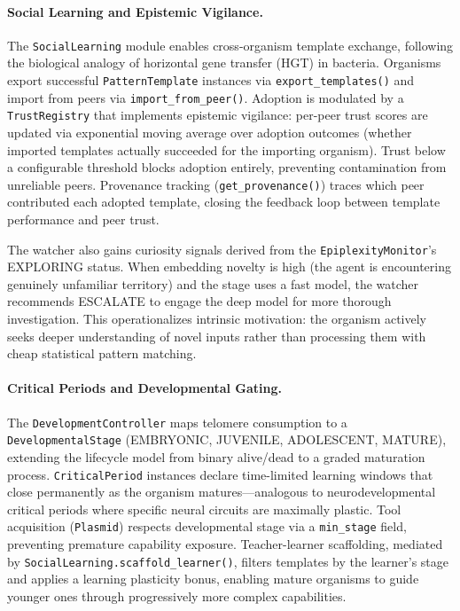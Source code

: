 \paragraph{Social Learning and Epistemic Vigilance.}
\label{sec:social-learning}
The \texttt{SocialLearning} module enables cross-organism template exchange, following the biological analogy of horizontal gene transfer (HGT) in bacteria. Organisms export successful \texttt{PatternTemplate} instances via \texttt{export\_templates()} and import from peers via \texttt{import\_from\_peer()}. Adoption is modulated by a \texttt{TrustRegistry} that implements epistemic vigilance: per-peer trust scores are updated via exponential moving average over adoption outcomes (whether imported templates actually succeeded for the importing organism). Trust below a configurable threshold blocks adoption entirely, preventing contamination from unreliable peers. Provenance tracking (\texttt{get\_provenance()}) traces which peer contributed each adopted template, closing the feedback loop between template performance and peer trust.

The watcher also gains curiosity signals derived from the \texttt{EpiplexityMonitor}'s EXPLORING status. When embedding novelty is high (the agent is encountering genuinely unfamiliar territory) and the stage uses a fast model, the watcher recommends ESCALATE to engage the deep model for more thorough investigation. This operationalizes intrinsic motivation: the organism actively seeks deeper understanding of novel inputs rather than processing them with cheap statistical pattern matching.

\paragraph{Critical Periods and Developmental Gating.}
\label{sec:developmental-gating}
The \texttt{DevelopmentController} maps telomere consumption to a \texttt{DevelopmentalStage} (EMBRYONIC, JUVENILE, ADOLESCENT, MATURE), extending the lifecycle model from binary alive/dead to a graded maturation process. \texttt{CriticalPeriod} instances declare time-limited learning windows that close permanently as the organism matures---analogous to neurodevelopmental critical periods where specific neural circuits are maximally plastic. Tool acquisition (\texttt{Plasmid}) respects developmental stage via a \texttt{min\_stage} field, preventing premature capability exposure. Teacher-learner scaffolding, mediated by \texttt{SocialLearning.scaffold\_learner()}, filters templates by the learner's stage and applies a learning plasticity bonus, enabling mature organisms to guide younger ones through progressively more complex capabilities.


